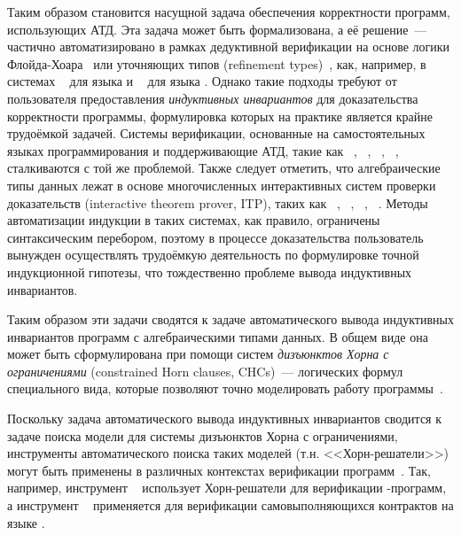 Таким образом становится насущной задача обеспечения корректности программ, использующих АТД.
Эта задача может быть формализована, а её решение~--- частично автоматизировано в рамках дедуктивной верификации на основе логики Флойда-Хоара~\cite{Floyd1993,10.1145/363235.363259} или уточняющих типов (refinement types)~\cite{713327}, как, например, в системах \flux{}~\cite{https://doi.org/10.48550/arxiv.2207.04034} для языка \rust{} и \leon{}~\cite{10.1007/978-3-642-23702-7_23} для языка \scala{}.
Однако такие подходы требуют от пользователя предоставления \emph{индуктивных инвариантов} для доказательства корректности программы, формулировка которых на практике является крайне трудоёмкой задачей. Системы верификации, основанные на самостоятельных языках программирования и поддерживающие АТД, такие как \dafny{}~\cite{10.1007/978-3-642-17511-4_20}, \whyThree{}~\cite{10.1007/978-3-642-37036-6_8}, \viper{}~\cite{10.1007/978-3-662-49122-5_2}, \fstar{}~\cite{10.1145/2914770.2837655}, сталкиваются с той же проблемой.
Также следует отметить, что алгебраические типы данных лежат в основе многочисленных интерактивных систем проверки доказательств (interactive theorem prover, ITP), таких как \coq{}~\cite{barras1999coq}, \idris{}~\cite{brady_2013}, \agda{}~\cite{10.1145/3341691}, \lean{}~\cite{10.1007/978-3-030-79876-5_37}.
Методы автоматизации индукции в таких системах, как правило, ограничены синтаксическим перебором, поэтому в процессе доказательства пользователь вынужден осуществлять трудоёмкую деятельность по формулировке точной индукционной гипотезы, что тождественно проблеме вывода индуктивных инвариантов.

Таким образом эти задачи сводятся к задаче автоматического вывода индуктивных инвариантов программ с алгебраическими типами данных. В общем виде она может быть сформулирована при помощи систем \emph{дизъюнктов Хорна с ограничениями} (constrained Horn clauses, CHCs)~--- логических формул специального вида, которые позволяют точно моделировать работу программы~\cite{MAKOWSKY1987266}.

Поскольку задача автоматического вывода индуктивных инвариантов сводится к задаче поиска модели для системы дизъюнктов Хорна с ограничениями, инструменты автоматического поиска таких моделей (т.\:н. <<Хорн-решатели>>) могут быть применены в различных контекстах верификации программ~\cite{10.1145/2254064.2254112,Bjorner2015}.
Так, например, инструмент \rustHorn{}~\cite{10.1145/3462205} использует Хорн-решатели для верификации \rust{}-программ, а инструмент \solCMC{}~\cite{10.1007/978-3-031-13185-1_16} применяется для верификации самовыполняющихся контрактов на языке \solidity{}.

